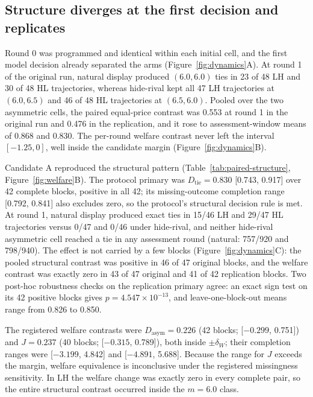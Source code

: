 \documentclass[sigconf,review,anonymous]{acmart}
\begin{document}
\subsection{Structure diverges at the first decision and replicates}

Round 0 was programmed and identical within each initial cell, and the first model decision already separated the arms (Figure~\ref{fig:dynamics}A). At round 1 of the original run, natural display produced $(6.0,6.0)$ ties in 23 of 48 LH and 30 of 48 HL trajectories, whereas hide-rival kept all 47 LH trajectories at $(6.0,6.5)$ and 46 of 48 HL trajectories at $(6.5,6.0)$. Pooled over the two asymmetric cells, the paired equal-price contrast was 0.553 at round 1 in the original run and 0.476 in the replication, and it rose to assessment-window means of 0.868 and 0.830. The per-round welfare contrast never left the interval $[-1.25, 0]$, well inside the candidate margin (Figure~\ref{fig:dynamics}B).

Candidate A reproduced the structural pattern (Table~\ref{tab:paired-structure}, Figure~\ref{fig:welfare}B). The protocol primary was $D_{\mathrm{tie}}=0.830$ [0.743, 0.917] over 42 complete blocks, positive in all 42; its missing-outcome completion range [0.792, 0.841] also excludes zero, so the protocol's structural decision rule is met. At round 1, natural display produced exact ties in 15/46 LH and 29/47 HL trajectories versus 0/47 and 0/46 under hide-rival, and neither hide-rival asymmetric cell reached a tie in any assessment round (natural: 757/920 and 798/940). The effect is not carried by a few blocks (Figure~\ref{fig:dynamics}C): the pooled structural contrast was positive in 46 of 47 original blocks, and the welfare contrast was exactly zero in 43 of 47 original and 41 of 42 replication blocks. Two post-hoc robustness checks on the replication primary agree: an exact sign test on its 42 positive blocks gives $p=4.547\times10^{-13}$, and leave-one-block-out means range from 0.826 to 0.850.

The registered welfare contrasts were $D_{\mathrm{asym}}=0.226$ (42 blocks; [$-0.299$, 0.751]) and $J=0.237$ (40 blocks; [$-0.315$, 0.789]), both inside $\pm\delta_W$; their completion ranges were [$-3.199$, 4.842] and [$-4.891$, 5.688]. Because the range for $J$ exceeds the margin, welfare equivalence is inconclusive under the registered missingness sensitivity. In LH the welfare change was exactly zero in every complete pair, so the entire structural contrast occurred inside the $m=6.0$ class.
\end{document}
